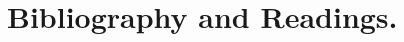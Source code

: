 \documentclass[12pt,leqno]{book}
\newcommand{\citep}[1]{\cite{#1}}
\begin{document}
\part{Bibliography and Readings.}




%

%




%
\end{document}
